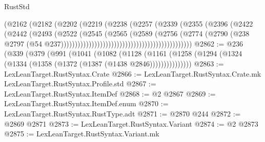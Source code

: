 \begin{lexlean}{RustStd}
\begin{coremodule}
{\begin{coremodule}
{{{{{{{{{{{{{{{{{{{{{{{{{{{{{{{{{{{{{{{{{{{{{{{{{{{{{{{{{{{{{{{{{{{{{{{{{{{{{{{{{{{{{                                                        (@2162
                                                          (@2182
                                                            (@2202
                                                              (@2219
                                                                (@2238
                                                                  (@2257
                                                                    (@2339
                                                                      (@2355
                                                                        (@2396
                                                                          (@2422
                                                                            (@2442
                                                                              (@2493
                                                                                (@2522
                                                                                  (@2545
                                                                                    (@2565
                                                                                      (@2589
                                                                                        (@2756
                                                                                          (@2774
                                                                                            (@2790
                                                                                              (@238
                                                                                                @2797
                                                                                                (@54
                                                                                                  @237)))))))))))))))))))))))))))))))))))))))))))))))
@2862 := @236
    (@339
      (@379
        (@991
          (@1041
            (@1082
              (@1128
                (@1161 (@1258 (@1294 (@1324 (@1334 (@1358 (@1372 (@1387 (@1438 @2846)))))))))))))))
@2863 := LexLeanTarget.RustSyntax.Crate
@2866 := LexLeanTarget.RustSyntax.Crate.mk LexLeanTarget.RustSyntax.Profile.std
@2867 := LexLeanTarget.RustSyntax.ItemDef
@2868 := @2 @2867
@2869 := LexLeanTarget.RustSyntax.ItemDef.enum
@2870 := LexLeanTarget.RustSyntax.RustType.adt
@2871 := @2870 @244
@2872 := @2869 @2871
@2873 := LexLeanTarget.RustSyntax.Variant
@2874 := @2 @2873
@2875 := LexLeanTarget.RustSyntax.Variant.mk
}}}}}}}}}}}}}}}}}}}}}}}}}}}}}}}}}}}}}}}}}}}}}}}}}}}}}}}}}}}}}}}}}}}}}}}}}}}}}}}}}}}}}
\end{coremodule}}
\end{coremodule}
\end{lexlean}
